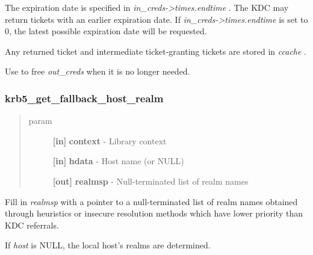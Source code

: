 \documentclass[letterpaper,10pt,english]{sphinxmanual}
\begin{document}
The expiration date is specified in \emph{in\_creds-\textgreater{}times.endtime} . The KDC may return tickets with an earlier expiration date. If \emph{in\_creds-\textgreater{}times.endtime} is set to 0, the latest possible expiration date will be requested.

Any returned ticket and intermediate ticket-granting tickets are stored in \emph{ccache} .

Use {\hyperref[appdev/refs/api/krb5_free_creds:krb5_free_creds]{}} to free \emph{out\_creds} when it is no longer needed.


\subsubsection{krb5\_get\_fallback\_host\_realm}
\label{appdev/refs/api/krb5_get_fallback_host_realm:krb5-get-fallback-host-realm}\label{appdev/refs/api/krb5_get_fallback_host_realm::doc}

\begin{fulllineitems}
\label{appdev/refs/api/krb5_get_fallback_host_realm:krb5_get_fallback_host_realm}
\end{fulllineitems}

\begin{quote}\begin{description}
\item[{param}] \leavevmode
\textbf{{[}in{]}} \textbf{context} - Library context

\textbf{{[}in{]}} \textbf{hdata} - Host name (or NULL)

\textbf{{[}out{]}} \textbf{realmsp} - Null-terminated list of realm names

\end{description}\end{quote}

Fill in \emph{realmsp} with a pointer to a null-terminated list of realm names obtained through heuristics or insecure resolution methods which have lower priority than KDC referrals.

If \emph{host} is NULL, the local host's realms are determined.
\end{document}
